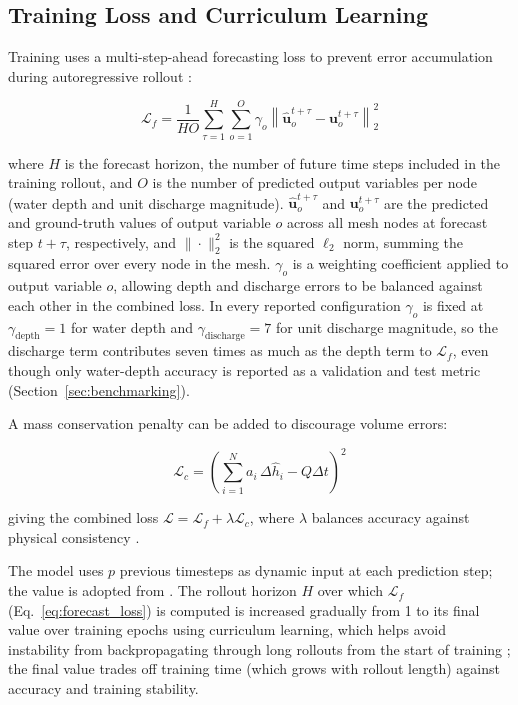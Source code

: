 \documentclass[12pt,a4paper]{report}
\begin{document}
 
\subsection{Training Loss and Curriculum Learning}
\label{subsec:training_validation}
 
Training uses a multi-step-ahead forecasting loss to prevent error accumulation during
autoregressive rollout \citep{bentivoglio2025mswegnn}:
 
\begin{equation}
    \mathcal{L}_f = \frac{1}{HO} \sum_{\tau=1}^{H} \sum_{o=1}^{O} \gamma_o
    \left\| \hat{\mathbf{u}}_o^{t+\tau} - \mathbf{u}_o^{t+\tau} \right\|_2^2
    \label{eq:forecast_loss}
\end{equation}

where $H$ is the forecast horizon, the number of future time steps included in the
training rollout, and $O$ is the number of predicted output variables per node (water
depth and unit discharge magnitude). $\hat{\mathbf{u}}_o^{t+\tau}$ and
$\mathbf{u}_o^{t+\tau}$ are the predicted and ground-truth values of output variable
$o$ across all mesh nodes at forecast step $t+\tau$, respectively, and
$\|\cdot\|_2^2$ is the squared $\ell_2$ norm, summing the squared error over every
node in the mesh. $\gamma_o$ is a weighting coefficient applied to output variable
$o$, allowing depth and discharge errors to be balanced against each other in the
combined loss. In every reported configuration $\gamma_o$ is fixed at
$\gamma_\text{depth}=1$ for water depth and $\gamma_\text{discharge}=7$ for unit
discharge magnitude, so the discharge term contributes seven times as much as the
depth term to $\mathcal{L}_f$, even though only water-depth accuracy is reported as
a validation and test metric (Section~\ref{sec:benchmarking}).

A mass conservation penalty can be added to discourage volume errors:
 
\begin{equation}
    \mathcal{L}_c = \left( \sum_{i=1}^{N} a_i \, \Delta \hat{h}_i - Q \Delta t \right)^2
    \label{eq:mass_loss}
\end{equation}
 
giving the combined loss $\mathcal{L} = \mathcal{L}_f + \lambda \mathcal{L}_c$, where
$\lambda$ balances accuracy against physical consistency
\citep{bentivoglio2025mswegnn,taghizadeh2025hydrographnet}.

The model uses $p$ previous timesteps as dynamic input at each prediction step; the
value is adopted from \citet{bentivoglio2025mswegnn}. The rollout horizon $H$ over which $\mathcal{L}_f$
(Eq.~\ref{eq:forecast_loss}) is computed is increased gradually from 1 to its final
value over training epochs using curriculum learning, which helps avoid instability
from backpropagating through long rollouts from the start of training
\citep{bengio2009curriculum}; the final value trades off training time (which grows
with rollout length) against accuracy and training stability.
\end{document}
